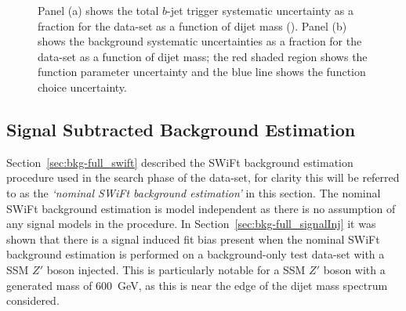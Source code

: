\begin{figure}[!ht]
  \begin{center}
    \captionsetup[subfigure]{aboveskip=0pt,justification=centering}
  \end{center}
  \vspace{-1em}
  \caption[The $b$-jet trigger and background systematic uncertainties for the \lm{} data-set as a function of dijet mass.]
    {Panel (a) shows the total $b$-jet trigger systematic uncertainty as a fraction for the \lm{} data-set as a function of dijet mass (\mjj).
    Panel (b) shows the background systematic uncertainties as a fraction for the \lm{} data-set as a function of dijet mass;
    the red shaded region shows the function parameter uncertainty and the blue line shows the function choice uncertainty.}
  \label{fig:lim-lowmass_syst}
\end{figure}

\subsection{Signal Subtracted Background Estimation}
\label{sec:lim-full_ssb}

Section~\ref{sec:bkg-full_swift} described the SWiFt background estimation procedure used in the search phase of the \lm{} data-set, 
for clarity this will be referred to as the \textit{`nominal SWiFt background estimation'} in this section.
The nominal SWiFt background estimation is model independent as there is no assumption of any signal models in the procedure.
In Section~\ref{sec:bkg-full_signalInj} it was shown that there is a signal induced fit bias present when
the nominal SWiFt background estimation is performed on a background-only test data-set with a SSM $Z'$ boson injected.
This is particularly notable for a SSM $Z'$ boson with a generated mass of 600~GeV,
as this is near the edge of the dijet mass spectrum considered.

